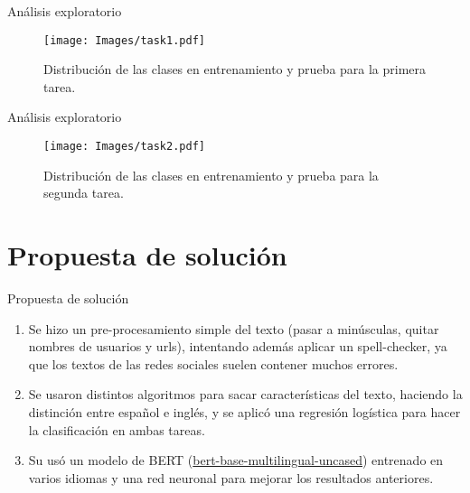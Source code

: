 \documentclass[10pt]{beamer}
\begin{document}
\begin{frame}{Análisis exploratorio}
\justify	
\small

\begin{figure}[H]
\centering
\texttt{[image: Images/task1.pdf]}
\caption{Distribución de las clases en entrenamiento y prueba para la primera tarea.}
\end{figure}

\end{frame} 

\begin{frame}{Análisis exploratorio}
\justify	
\small

\begin{figure}[H]
\centering
\texttt{[image: Images/task2.pdf]}
\caption{Distribución de las clases en entrenamiento y prueba para la segunda tarea.}
\end{figure}

\end{frame} 

\section{Propuesta de solución}
\begin{frame}{Propuesta de solución}
\justify	
\small
\begin{enumerate}
\item Se hizo un pre-procesamiento simple del texto (pasar a minúsculas, quitar nombres de usuarios y urls), intentando además aplicar un spell-checker, ya que los textos de las redes sociales suelen contener muchos errores.

\item Se usaron distintos algoritmos para sacar características del texto, haciendo la distinción entre español e inglés, y se aplicó una regresión logística para hacer la clasificación en ambas tareas.

\item Su usó un modelo de BERT (\href{https://huggingface.co/bert-base-multilingual-uncased}{bert-base-multilingual-uncased}) entrenado en varios idiomas y una red neuronal para mejorar los resultados anteriores.
 
\end{enumerate}

\end{frame}
\end{document}
